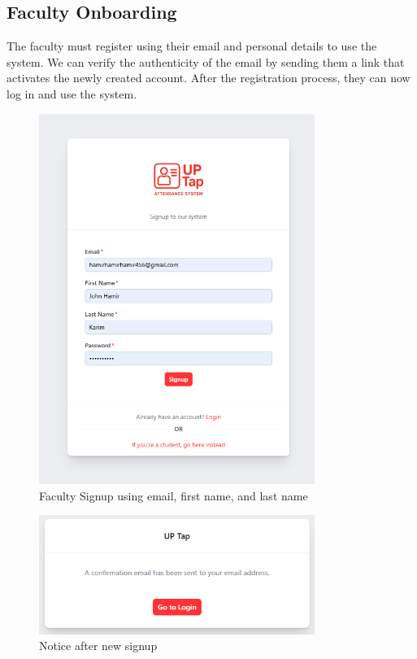 \subsection{Faculty Onboarding}
The faculty must register using their email and personal details to use the system. We can verify the authenticity of the email by sending them a link that activates the newly created account. After the registration process, they can now log in and use the system.
\begin{figure}[h] %
	\centering
	\includegraphics[width=0.8\textwidth]{figures/chapter4/faculty_signup.png} %
	\caption{Faculty Signup using email, first name, and last name}
	\label{fig:faculty_signup}
\end{figure}
\clearpage
\begin{figure}[h] %
	\centering
	\includegraphics[width=0.8\textwidth]{figures/chapter4/faculty_signup_info.png} %
	\caption{Notice after new signup}
	\label{fig:faculty_signup_info}
\end{figure}
